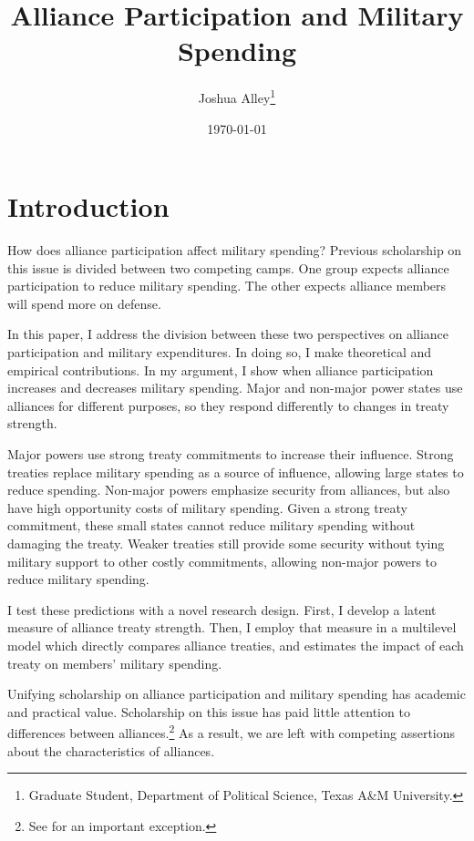 \documentclass[12pt]{article}
\title{\textbf{Alliance Participation and Military Spending}}
\author{Joshua Alley\footnote{Graduate Student,
Department of Political Science, Texas A\&M University.}}
\date{{\normalsize \today}}
\begin{document}
\maketitle 

\newpage 

\doublespace 

\begin{abstract}



\end{abstract}



\section{Introduction}


How does alliance participation affect military spending? 
Previous scholarship on this issue is divided between two competing camps. 
One group expects alliance participation to reduce military spending. 
The other expects alliance members will spend more on defense. 


In this paper, I address the division between these two perspectives on alliance participation and military expenditures. 
In doing so, I make theoretical and empirical contributions. 
In my argument, I show when alliance participation increases and decreases military spending. 
Major and non-major power states use alliances for different purposes, so they respond differently to changes in treaty strength.


Major powers use strong treaty commitments to increase their influence. 
Strong treaties replace military spending as a source of influence, allowing large states to reduce spending. 
Non-major powers emphasize security from alliances, but also have high opportunity costs of military spending.  
Given a strong treaty commitment, these small states cannot reduce military spending without damaging the treaty. 
Weaker treaties still provide some security without tying military support to other costly commitments, allowing non-major powers to reduce military spending. 


I test these predictions with a novel research design.
First, I develop a latent measure of alliance treaty strength. 
Then, I employ that measure in a multilevel model which directly compares alliance treaties, and estimates the impact of each treaty on members' military spending.  


Unifying scholarship on alliance participation and military spending has academic and practical value.
Scholarship on this issue has paid little attention to differences between alliances.\footnote{See \citet{DigiuseppePoast2016} for an important exception.} 
As a result, we are left with competing assertions about the characteristics of alliances. 
\end{document}
